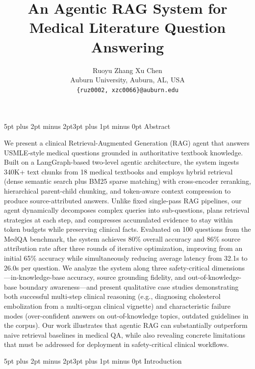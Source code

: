 \documentclass[10pt,twocolumn,letterpaper]{article}
\makeatletter
\renewcommand\section{\@startsection{section}{1}{\z@}%
  {5pt plus 2pt minus 2pt}{3pt plus 1pt minus 0pt}%
  {\large\bfseries}}
\makeatother
\begin{document}
\title{An Agentic RAG System for Medical Literature Question Answering}
\author{Ruoyu Zhang \quad Xu Chen\\
Auburn University, Auburn, AL, USA\\
{\tt\small \{ruz0002, xzc0066\}@auburn.edu}
}
\maketitle

\vspace{-2pt}
\section{Abstract}

We present a clinical Retrieval-Augmented Generation (RAG) agent that answers USMLE-style medical questions grounded in authoritative textbook knowledge. Built on a LangGraph-based two-level agentic architecture, the system ingests 340K+ text chunks from 18 medical textbooks and employs hybrid retrieval (dense semantic search plus BM25 sparse matching) with cross-encoder reranking, hierarchical parent-child chunking, and token-aware context compression to produce source-attributed answers. Unlike fixed single-pass RAG pipelines, our agent dynamically decomposes complex queries into sub-questions, plans retrieval strategies at each step, and compresses accumulated evidence to stay within token budgets while preserving clinical facts. Evaluated on 100 questions from the MedQA benchmark, the system achieves 80\% overall accuracy and 86\% source attribution rate after three rounds of iterative optimization, improving from an initial 65\% accuracy while simultaneously reducing average latency from 32.1s to 26.0s per question. We analyze the system along three safety-critical dimensions---in-knowledge-base accuracy, source grounding fidelity, and out-of-knowledge-base boundary awareness---and present qualitative case studies demonstrating both successful multi-step clinical reasoning (e.g., diagnosing cholesterol embolization from a multi-organ clinical vignette) and characteristic failure modes (over-confident answers on out-of-knowledge topics, outdated guidelines in the corpus). Our work illustrates that agentic RAG can substantially outperform naive retrieval baselines in medical QA, while also revealing concrete limitations that must be addressed for deployment in safety-critical clinical workflows.

\section{Introduction}
\end{document}
